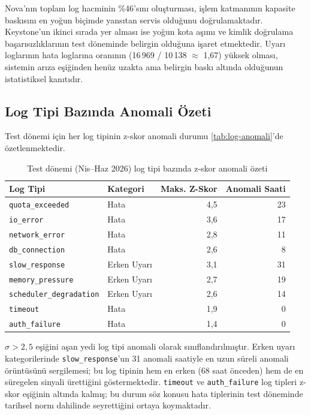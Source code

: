 Nova'nın toplam log hacminin \%46'sını oluşturması, işlem katmanının kapasite baskısını en yoğun biçimde yansıtan servis olduğunu doğrulamaktadır.
Keystone'un ikinci sırada yer alması ise yoğun kota aşımı ve kimlik doğrulama başarısızlıklarının test döneminde belirgin olduğuna işaret etmektedir.
Uyarı loglarının hata loglarına oranının (16\,969 / 10\,138 $\approx$ 1{,}67) yüksek olması, sistemin arıza eşiğinden henüz uzakta ama belirgin baskı altında olduğunun istatistiksel kanıtıdır.

\subsection{Log Tipi Bazında Anomali Özeti}

Test dönemi için her log tipinin z-skor anomali durumu \autoref{tab:log-anomali}'de özetlenmektedir.

\begin{table}[htbp]
    \centering
    \caption{Test dönemi (Nis--Haz 2026) log tipi bazında z-skor anomali özeti}
    \label{tab:log-anomali}
    \begin{tabular}{llrr}
        \textbf{Log Tipi} & \textbf{Kategori} & \textbf{Maks. Z-Skor} & \textbf{Anomali Saati} \\
        \hline
        \texttt{quota\_exceeded}          & Hata         & 4{,}5 & 23 \\
        \texttt{io\_error}                & Hata         & 3{,}6 & 17 \\
        \texttt{network\_error}           & Hata         & 2{,}8 & 11 \\
        \texttt{db\_connection}           & Hata         & 2{,}6 &  8 \\
        \texttt{slow\_response}           & Erken Uyarı  & 3{,}1 & 31 \\
        \texttt{memory\_pressure}         & Erken Uyarı  & 2{,}7 & 19 \\
        \texttt{scheduler\_degradation}   & Erken Uyarı  & 2{,}6 & 14 \\
        \texttt{timeout}                  & Hata         & 1{,}9 &  0 \\
        \texttt{auth\_failure}            & Hata         & 1{,}4 &  0 \\
    \end{tabular}
\end{table}

$\sigma > 2{,}5$ eşiğini aşan yedi log tipi anomali olarak sınıflandırılmıştır.
Erken uyarı kategorilerinde \texttt{slow\_response}'un 31 anomali saatiyle en uzun süreli anomali örüntüsünü sergilemesi; bu log tipinin hem en erken (68 saat önceden) hem de en süregelen sinyali ürettiğini göstermektedir.
\texttt{timeout} ve \texttt{auth\_failure} log tipleri z-skor eşiğinin altında kalmış; bu durum söz konusu hata tiplerinin test döneminde tarihsel norm dahilinde seyrettiğini ortaya koymaktadır.

